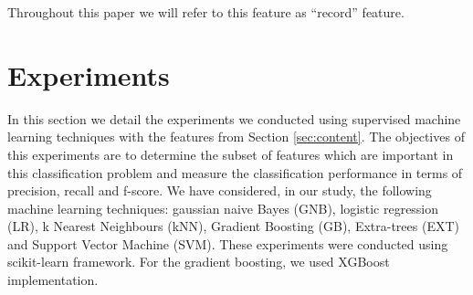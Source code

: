Throughout this paper we will refer to this feature as ``record'' feature.





\section{Experiments}\label{sec:exp}


In this section we detail the experiments we conducted using supervised
machine learning techniques with the features from Section \ref{sec:content}.
The objectives of this experiments are to determine the subset of features which
are important in this classification problem and measure the classification
performance in terms of precision, recall and f-score.
We have considered, in our study, the following machine learning techniques:
gaussian naive Bayes (GNB), logistic regression (LR), k Nearest Neighbours
(kNN), Gradient Boosting (GB), Extra-trees (EXT) and Support Vector Machine
(SVM). These experiments were conducted using scikit-learn\cite{scikit-learn}
framework. For the gradient boosting, we used
XGBoost\cite{Chen:2016:XST:2939672.2939785} implementation.

